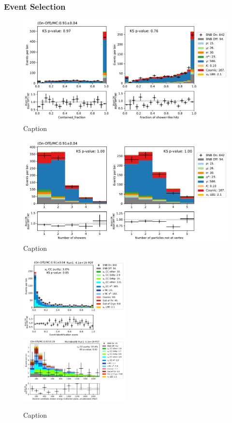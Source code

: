 \subsubsection{Event Selection}

\begin{figure}
    \centering
    \includegraphics[width=\textwidth]{NueCCsel/Images/run1/bdt_1.pdf}
    \caption{Caption}
    \label{fig:bdt_1}
\end{figure}

\begin{figure}
    \centering
    \includegraphics[width=\textwidth]{NueCCsel/Images/run1/bdt_2.pdf}
    \caption{Caption}
    \label{fig:bdt_2}
\end{figure}

\begin{figure}
    \centering
    \includegraphics[width=0.495\textwidth]{NueCCsel/Images/run1/pre_event_score.pdf}
    \includegraphics[width=0.495\textwidth]{NueCCsel/Images/run1/nue_shower_energy_y.pdf}
    \caption{Caption}
    \label{fig:pre_daughter_score}
\end{figure}


